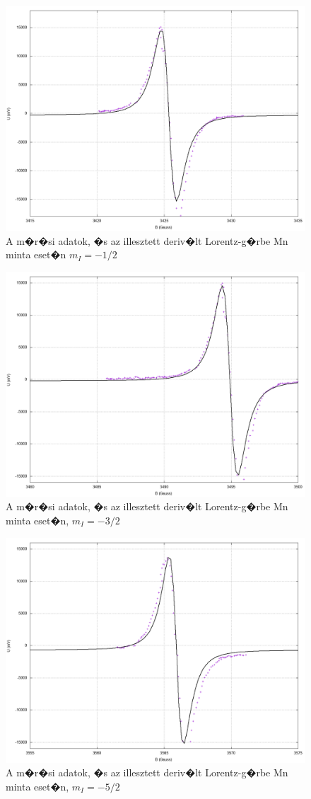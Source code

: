 \documentclass[a4paper,12pt]{article}
\begin{document}
\begin{figure}[H]
\includegraphics[width=15cm]{Mn4.png}
\centering
\caption{A m�r�si adatok, �s az illesztett deriv�lt Lorentz-g�rbe Mn minta eset�n $m_I = -1/2$}
\label{fig:7}
\end{figure}


\begin{figure}[H]
\includegraphics[width=15cm]{Mn5.png}
\centering
\caption{A m�r�si adatok, �s az illesztett deriv�lt Lorentz-g�rbe Mn minta eset�n, $m_I = -3/2$}
\label{fig:8}
\end{figure}


\begin{figure}[H]
\includegraphics[width=15cm]{Mn6.png}
\centering
\caption{A m�r�si adatok, �s az illesztett deriv�lt Lorentz-g�rbe Mn minta eset�n, $m_I = -5/2$}
\label{fig:9}
\end{figure}
\end{document}
